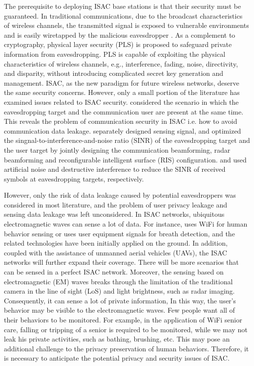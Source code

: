 \documentclass[10pt,journal,twocolumn,twoside]{IEEEtran} %
\begin{document}
The prerequisite to deploying ISAC base stations is that their security must be guaranteed. In traditional communications, due to the broadcast characteristics of wireless channels, the transmitted signal is exposed to vulnerable environments and is easily wiretapped by the malicious eavesdropper \cite{zhang2023physical}. As a
complement to cryptography, physical layer security (PLS) is
proposed to safeguard private information from eavesdropping. PLS is capable of exploiting the physical characteristics of wireless channels, e.g., interference, fading, noise, directivity, and disparity, without introducing complicated secret key generation and management. ISAC, as the new paradigm for future wireless networks, deserve the same security concerns. 
However, only a small portion of the literature has examined issues related to ISAC security.  \cite{9199556,9737364,10143420,Xu2023ASD} considered the scenario in which the eavesdropping target and the communication user are present at the same time. This reveals the problem of communication security in ISAC i.e. how to avoid communication data leakage. \cite{9199556} separately designed sensing signal, and optimized the singnal-to-interference-and-noise ratio (SINR) of the eavesdropping target and the user target by jointly designing the communication beamforming, radar beamforming and reconfigurable intelligent surface (RIS) configuration. \cite{9737364} and \cite{9199556} used artificial noise and destructive interference to reduce the SINR of received symbols at eavesdropping targets, respectively.


However,  only the risk of data leakage caused by potential eavesdroppers was considered in  most literature, and the problem of user privacy leakage and sensing data leakage was left unconsidered. In ISAC networks, ubiquitous electromagnetic waves can sense a lot of data. For instance, \cite{8897594} uses WiFi for human behavior sensing or uses user equipment signals for breath detection, and the related technologies have been initially applied on the ground. In addition, coupled with the assistance of unmanned aerial vehicles (UAVs), the ISAC networks will further expand their coverage. There will be more scenarios that can be sensed in a perfect ISAC network. Moreover, the sensing based on electromagnetic (EM) waves breaks through the limitation of the traditional camera in the line of sight (LoS) and light brightness, such as radar imaging. Consequently, it can sense a lot of private information,  In this way, the user's behavior may be visible to the electromagnetic waves. Few people want 
all of their behaviors to be monitored. For example, in the application of WiFi senior care, falling or tripping of a senior is required to be monitored, while we may not leak his private activities, such as bathing, brushing, etc. This may pose an additional challenge to the privacy preservation of human behaviors. Therefore, it is necessary to anticipate the potential privacy and security issues of ISAC.
\end{document}
